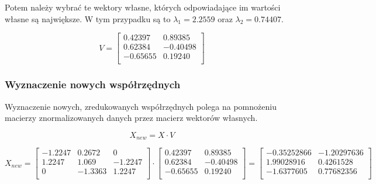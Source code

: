 \documentclass{article}
\begin{document}
Potem należy wybrać te wektory własne, których odpowiadające im wartości własne
są największe. W tym przypadku są to $\lambda_1 = 2.2559$ oraz $\lambda_2 = 0.74407$.

\begin{equation*}
    V = 
    \begin{bmatrix}
        0.42397 & 0.89385 \\
        0.62384 & -0.40498 \\
        -0.65655 & 0.19240 \\
    \end{bmatrix}
\end{equation*}

\subsubsection*{Wyznaczenie nowych współrzędnych}

Wyznaczenie nowych, zredukowanych współrzędnych polega na pomnożeniu macierzy
znormalizowanych danych przez macierz wektorów własnych.

\begin{equation}
    X_{new} = X \cdot V
\end{equation}

\begin{equation*}
    X_{new} = 
    \begin{bmatrix}
        -1.2247 & 0.2672 & 0 \\
        1.2247 & 1.069 & -1.2247 \\
        0 & -1.3363 & 1.2247 \\
    \end{bmatrix}
    \cdot
    \begin{bmatrix}
        0.42397 & 0.89385 \\
        0.62384 & -0.40498 \\
        -0.65655 & 0.19240  \\
    \end{bmatrix}
    =
    \begin{bmatrix}
        -0.35252866 & -1.20297636 \\
        1.99028916 & 0.4261528 \\
        -1.6377605 & 0.77682356 \\
    \end{bmatrix}
\end{equation*}
\end{document}
